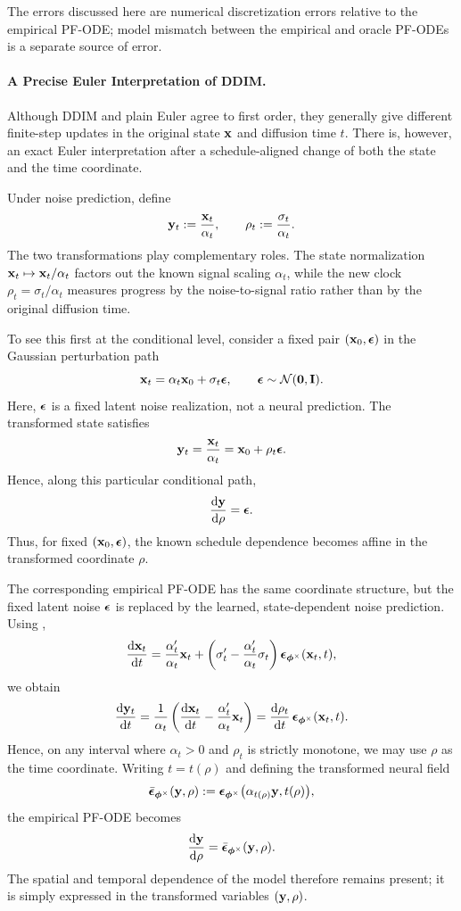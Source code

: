 The errors discussed here are numerical discretization errors relative to the
empirical PF-ODE; model mismatch between the empirical and oracle PF-ODEs is
a separate source of error.


\paragraph{A Precise Euler Interpretation of DDIM.}
Although DDIM and plain Euler agree to first order, they generally give
different finite-step updates in the original state ${\mathbf{x}}$ and diffusion time
$t$. There is, however, an exact Euler interpretation after a
schedule-aligned change of both the state and the time coordinate.

Under noise prediction, define
\begin{equation*}
{\mathbf{y}}_t
:=
\frac{{\mathbf{x}}_t}{\alpha_t},
\qquad
\rho_t
:=
\frac{\sigma_t}{\alpha_t}.
\end{equation*}
The two transformations play complementary roles. The state normalization
${\mathbf{x}}_t\mapsto{\mathbf{x}}_t/\alpha_t$ factors out the known signal scaling
$\alpha_t$, while the new clock
$\rho_t=\sigma_t/\alpha_t$ measures progress by the noise-to-signal ratio
rather than by the original diffusion time.

To see this first at the conditional level, consider a fixed pair
$({\mathbf{x}}_0,{\bm{\epsilon}})$ in the Gaussian perturbation path
\[
{\mathbf{x}}_t
=
\alpha_t{\mathbf{x}}_0+\sigma_t{\bm{\epsilon}},
\qquad
{\bm{\epsilon}}\sim\mathcal N(\mathbf 0,\mathbf I).
\]
Here, ${\bm{\epsilon}}$ is a fixed latent noise realization, not a neural prediction.
The transformed state satisfies
\[
{\mathbf{y}}_t
=
\frac{{\mathbf{x}}_t}{\alpha_t}
=
{\mathbf{x}}_0+\rho_t{\bm{\epsilon}}.
\]
Hence, along this particular conditional path,
\[
\frac{\mathop{}\!\mathrm{d}{\mathbf{y}}}{\mathop{}\!\mathrm{d}\rho}
=
{\bm{\epsilon}}.
\]
Thus, for fixed $({\mathbf{x}}_0,{\bm{\epsilon}})$, the known schedule dependence becomes affine
in the transformed coordinate $\rho$.

The corresponding empirical PF-ODE has the same coordinate structure, but
the fixed latent noise ${\bm{\epsilon}}$ is replaced by the learned, state-dependent
noise prediction. Using ,
\[
\frac{\mathop{}\!\mathrm{d}{\mathbf{x}}_t}{\mathop{}\!\mathrm{d} t}
=
\frac{\alpha_t'}{\alpha_t}{\mathbf{x}}_t
+
\left(
\sigma_t'
-
\frac{\alpha_t'}{\alpha_t}\sigma_t
\right)
{\bm{\epsilon}}_{\bm{\phi}^\times}({\mathbf{x}}_t,t),
\]
we obtain
\begin{align}
\frac{\mathop{}\!\mathrm{d}{\mathbf{y}}_t}{\mathop{}\!\mathrm{d} t}
=
\frac{1}{\alpha_t}
\left(
\frac{\mathop{}\!\mathrm{d}{\mathbf{x}}_t}{\mathop{}\!\mathrm{d} t}
-
\frac{\alpha_t'}{\alpha_t}{\mathbf{x}}_t
\right)=
\frac{\mathop{}\!\mathrm{d}\rho_t}{\mathop{}\!\mathrm{d} t}\,
{\bm{\epsilon}}_{\bm{\phi}^\times}({\mathbf{x}}_t,t).
\label{eq:ddim-coordinate-ode-t}
\end{align}
Hence, on any interval where $\alpha_t>0$ and $\rho_t$ is strictly monotone,
we may use $\rho$ as the time coordinate. Writing $t=t(\rho)$ and defining
the transformed neural field
\[
\bar{{\bm{\epsilon}}}_{\bm{\phi}^\times}({\mathbf{y}},\rho)
:=
{\bm{\epsilon}}_{\bm{\phi}^\times}
\bigl(
\alpha_{t(\rho)}{\mathbf{y}},
t(\rho)
\bigr),
\]
the empirical PF-ODE becomes
\begin{equation}
\label{eq:ddim-coordinate-ode-rho}
\frac{\mathop{}\!\mathrm{d}{\mathbf{y}}}{\mathop{}\!\mathrm{d}\rho}
=
\bar{{\bm{\epsilon}}}_{\bm{\phi}^\times}({\mathbf{y}},\rho).
\end{equation}
The spatial and temporal dependence of the model therefore remains present;
it is simply expressed in the transformed variables $({\mathbf{y}},\rho)$.

